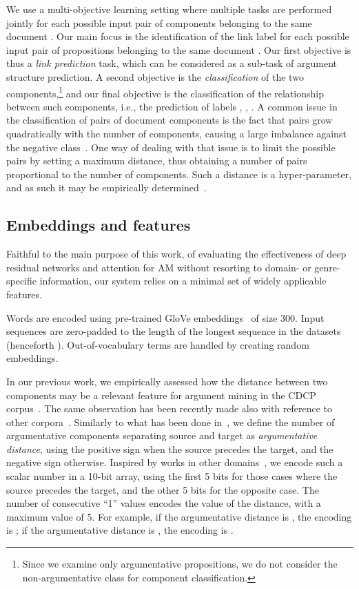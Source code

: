 \documentclass[journal]{IEEEtran}
\begin{document}
We use a multi-objective learning setting where multiple tasks are performed jointly for each possible input pair of components  belonging to the same document . Our main focus is the identification of the link label  for each possible input pair of propositions  belonging to the same document . Our first objective is thus a \emph{link prediction} task, which can be considered as a sub-task of argument structure prediction. A second objective is the \emph{classification} of the two components,\footnote{Since we examine only argumentative propositions, we do not consider the non-argumentative class for component classification. } and our final objective is the classification of the relationship between such components, i.e., the prediction of labels , , .
A common issue in the classification of pairs of document components is the fact that pairs grow quadratically with the number of components, causing a large imbalance against the negative class~\cite{DBLP:conf/ecai/0002CV20,poudyal-etal-2020-echr}.
One way of dealing with that issue is to limit the possible pairs by setting a maximum distance, thus obtaining a number of pairs proportional to the number of components. Such a distance is a hyper-parameter, and as such it may be empirically determined~\cite{poudyal-etal-2020-echr}.


\subsection{Embeddings and features}

Faithful to the main purpose of this work, of evaluating the effectiveness of deep residual networks and attention for AM without resorting to domain- or genre-specific information, our system relies on a minimal set of widely applicable features.

Words are encoded using pre-trained GloVe embeddings~\cite{pennington2014glove} of size 300. Input sequences are zero-padded to the length of the longest sequence in the datasets (henceforth ). Out-of-vocabulary terms are handled by creating random embeddings. 

In our previous work, we empirically assessed how the distance between two components may be a relevant feature for argument mining in the CDCP corpus~\cite{W18-5201}. The same observation has been recently made also with reference to other corpora~\cite{eger2017neural,DBLP:conf/ecai/0002CV20,poudyal-etal-2020-echr}.
Similarly to what has been done in~\cite{eger2017neural}, we define the number of argumentative components separating source and target as \emph{argumentative distance}, using the positive sign when the source precedes the target, and the negative sign otherwise. Inspired by works in other domains~\cite{silver2016mastering,DBLP:journals/tciaig/ChesaniGLM18,DBLP:conf/cpaior/Galassi0MM18}, we encode such a scalar number in a 10-bit array, using the first 5 bits for those cases where the source precedes the target, and the other 5 bits for the opposite case. The number of  consecutive ``1'' values encodes the value of the distance, with a maximum value of 5. For example, if the argumentative distance is , the encoding is ; if the argumentative distance is , the encoding is .
\end{document}
